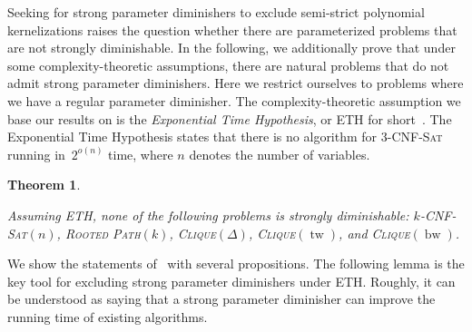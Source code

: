 \documentclass[11pt,a4,USenglish]{article}
\newcommand{\prob}[1]{\textsc{#1}}
\newcommand{\pprob}[2]{\prob{#1}$(#2)$}
\newcommand{\ETH}{\textnormal{ETH}}
\DeclareMathOperator{\tw}{tw}
\DeclareMathOperator{\bw}{bw}
\theoremstyle{definition}
\theoremstyle{plain}
\newtheorem{thm}{Theorem}
\theoremstyle{remark}
\begin{document}
Seeking for strong parameter diminishers to exclude semi-strict polynomial kernelizations raises the question whether there are parameterized problems that are not strongly diminishable.
In the following, we additionally prove that under some complexity-theoretic assumptions, there are natural problems that do not admit strong parameter diminishers. Here we restrict ourselves to problems where we have a regular parameter diminisher.
The complexity-theoretic assumption we base our results on is the \emph{Exponential Time Hypothesis}, or ETH for short~\cite{ImpagliazzoP01,lokshtanov2011lower}.
The Exponential Time Hypothesis states that there is no algorithm for \prob{3-CNF-Sat} running in~$2^{o(n)}$ time, where $n$ denotes the number of variables. 
%
%
%

%
%
%
%
%
%
%
%
%
%
%
%
%
%
%
%
%
%
%
%
%
%
%
%

\begin{thm}
\label{thm:main2}%
%

%
%
%
%
%
Assuming \ETH{}, none of the following problems is strongly diminishable: \pprob{$k$-CNF-Sat}{n}, \pprob{Rooted Path}{k}, \pprob{Clique}{\Delta}, \pprob{Clique}{\tw}, and \pprob{Clique}{\bw}.
%
%
\end{thm}
%
%
%
%
%
%
%
%
%
%
%
%
%
%
%
%
%
%
%
%
%
%
%
%
%
%
%
%
%
%
%
%
%
%
%
%
%
%
We show the statements of~ with several
propositions.
%
%
%
The following lemma is the key tool for excluding strong parameter diminishers under \ETH{}.
Roughly, it can be understood as saying that a strong parameter diminisher can improve the running time of existing algorithms.
\end{document}
